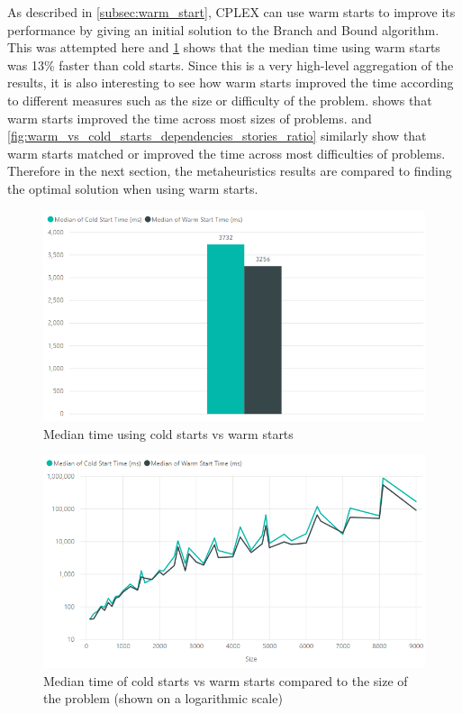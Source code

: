 As described in \cref{subsec:warm_start}, CPLEX can use warm starts to improve its performance by giving an initial solution to the Branch and Bound algorithm. This was attempted here and \cref{fig:warm_vs_cold_starts_time} shows that the median time using warm starts was 13\% faster than cold starts. Since this is a very high-level aggregation of the results, it is also interesting to see how warm starts improved the time according to different measures such as the size or difficulty of the problem.  shows that warm starts improved the time across most sizes of problems.  and \cref{fig:warm_vs_cold_starts_dependencies_stories_ratio} similarly show that warm starts matched or improved the time across most difficulties of problems. Therefore in the next section, the metaheuristics results are compared to finding the optimal solution when using warm starts.

\begin{figure}[h!]
    \centering
    \includegraphics[width=\textwidth]{Figures/WarmVsColdStarts/warm_vs_cold_time.png}
     \caption{Median time using cold starts vs warm starts}
     \label{fig:warm_vs_cold_starts_time}
\end{figure}

\begin{figure}[h!]
    \centering
    \includegraphics[width=\textwidth]{Figures/WarmVsColdStarts/warm_vs_cold_size.png}
     \caption{Median time of cold starts vs warm starts compared to the size of the problem (shown on a logarithmic scale)}
     \label{fig:warm_vs_cold_starts_size}
\end{figure}

